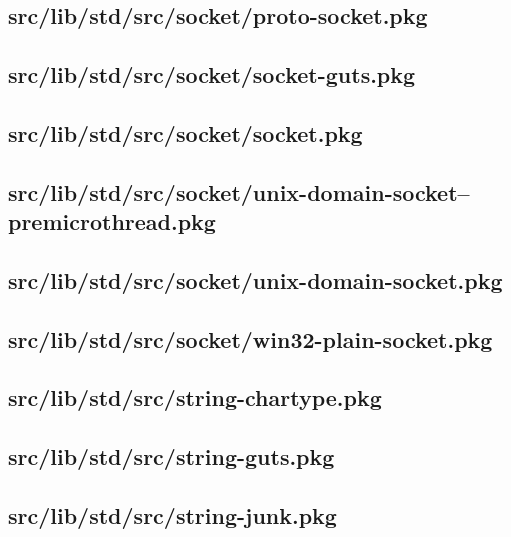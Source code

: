 \subsection{src/lib/std/src/socket/proto-socket.pkg}


\subsection{src/lib/std/src/socket/socket-guts.pkg}


\subsection{src/lib/std/src/socket/socket.pkg}


\subsection{src/lib/std/src/socket/unix-domain-socket--premicrothread.pkg}


\subsection{src/lib/std/src/socket/unix-domain-socket.pkg}


\subsection{src/lib/std/src/socket/win32-plain-socket.pkg}


\subsection{src/lib/std/src/string-chartype.pkg}


\subsection{src/lib/std/src/string-guts.pkg}


\subsection{src/lib/std/src/string-junk.pkg}



